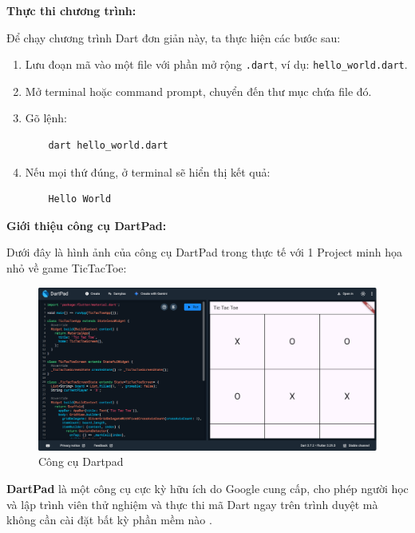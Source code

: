 \documentclass[../DoAn.tex]{subfiles}
\numberwithin{figure}{chapter}
\begin{document}
\begin{itemize}
\textbf{Thực thi chương trình:} 

Để chạy chương trình Dart đơn giản này, ta thực hiện các bước sau:
\begin{enumerate}
    \item Lưu đoạn mã vào một file với phần mở rộng \texttt{.dart}, ví dụ: \texttt{hello\_world.dart}.
    \item Mở terminal hoặc command prompt, chuyển đến thư mục chứa file đó.
    \item Gõ lệnh:
    \begin{verbatim}
    dart hello_world.dart
    \end{verbatim}
    \item Nếu mọi thứ đúng, ở terminal sẽ hiển thị kết quả:
    \begin{verbatim}
    Hello World
    \end{verbatim}
\end{enumerate}

\textbf{Giới thiệu công cụ DartPad:} 

Dưới đây là hình ảnh của công cụ DartPad trong thực tế với 1 Project minh họa nhỏ về game TicTacToe:

\begin{figure}[H]
    \centering
    \includegraphics[width=1\textwidth]{Hinhve/dartpad.png}
    \caption{Công cụ Dartpad}
    \label{fig:dartimg}
\end{figure}


\textbf{DartPad} là một công cụ cực kỳ hữu ích do Google cung cấp, cho phép người học và lập trình viên thử nghiệm và thực thi mã Dart ngay trên trình duyệt mà không cần cài đặt bất kỳ phần mềm nào .


\end{itemize}
\end{document}
